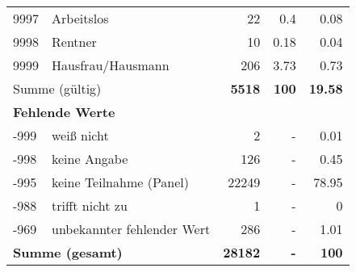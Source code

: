 \begin{longtable}{lXrrr}
        9997 & \multicolumn{1}{X}{Arbeitslos} & %
          \num{22} &
          \num[round-mode=places,round-precision=2]{0.4} &
          \num[round-mode=places,round-precision=2]{0.08} \\

        9998 & \multicolumn{1}{X}{Rentner} & %
          \num{10} &
          \num[round-mode=places,round-precision=2]{0.18} &
          \num[round-mode=places,round-precision=2]{0.04} \\

        9999 & \multicolumn{1}{X}{Hausfrau/Hausmann} & %
          \num{206} &
          \num[round-mode=places,round-precision=2]{3.73} &
          \num[round-mode=places,round-precision=2]{0.73} \\

     \midrule
     \multicolumn{2}{l}{Summe (gültig)} &
       \textbf{\num{5518}} &
     \textbf{100} &
       \textbf{\num[round-mode=places,round-precision=2]{19.58}} \\
     \multicolumn{5}{l}{\textbf{Fehlende Werte}}\\
       -999 &
       weiß nicht &
         \num{2} &
        - &
         \num[round-mode=places,round-precision=2]{0.01} \\
       -998 &
       keine Angabe &
         \num{126} &
        - &
         \num[round-mode=places,round-precision=2]{0.45} \\
       -995 &
       keine Teilnahme (Panel) &
         \num{22249} &
        - &
         \num[round-mode=places,round-precision=2]{78.95} \\
       -988 &
       trifft nicht zu &
         \num{1} &
        - &
         \num[round-mode=places,round-precision=2]{0} \\
       -969 &
       unbekannter fehlender Wert &
         \num{286} &
        - &
         \num[round-mode=places,round-precision=2]{1.01} \\
     \midrule
     \multicolumn{2}{l}{\textbf{Summe (gesamt)}} &
          \textbf{\num{28182}} &
        \textbf{-} &
        \textbf{100} \\
     \bottomrule
     \end{longtable}
     
